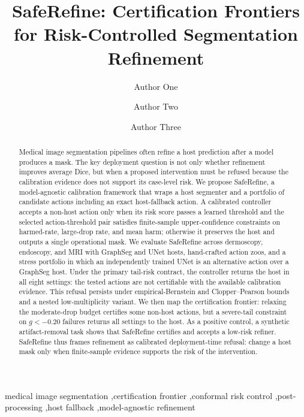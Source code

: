 \documentclass[preprint,12pt]{elsarticle}
\begin{document}
\begin{frontmatter}

\title{SafeRefine: Certification Frontiers for Risk-Controlled Segmentation Refinement}

\author[inst1]{Author One}
\author[inst1]{Author Two}
\author[inst1]{Author Three}
\address[inst1]{Institution, City, Country}

\begin{abstract}
Medical image segmentation pipelines often refine a host prediction after a
model produces a mask. The key deployment question is not only whether
refinement improves average Dice, but when a proposed intervention must be
refused because the calibration evidence does not support its case-level risk.
We propose SafeRefine, a model-agnostic calibration framework that wraps a host
segmenter and a portfolio of candidate actions including an exact host-fallback
action. A calibrated controller accepts a non-host action only when its risk
score passes a learned threshold and the selected action-threshold pair
satisfies finite-sample upper-confidence constraints on harmed-rate, large-drop
rate, and mean harm; otherwise it preserves the host and outputs a single
operational mask.
We evaluate SafeRefine across dermoscopy, endoscopy, and MRI with GraphSeg and
UNet hosts, hand-crafted action zoos, and a stress portfolio in which an
independently trained UNet is an alternative action over a GraphSeg host. Under
the primary tail-risk contract,
the controller returns the host in all eight settings: the tested actions are
not certifiable with the available calibration evidence. This refusal persists
under empirical-Bernstein and Clopper--Pearson bounds and a nested
low-multiplicity variant. We then map the certification frontier: relaxing the
moderate-drop budget certifies some non-host actions, but a severe-tail
constraint on $g<-0.20$ failures returns all settings to the host.
As a positive control, a synthetic artifact-removal task shows that SafeRefine
certifies and accepts a low-risk refiner. SafeRefine thus frames
refinement as calibrated deployment-time refusal: change a host mask only when
finite-sample evidence supports the risk of the intervention.
\end{abstract}

\begin{keyword}
medical image segmentation \sep certification frontier \sep conformal risk control
\sep post-processing \sep host fallback \sep model-agnostic refinement
\end{keyword}

\end{frontmatter}
\end{document}
